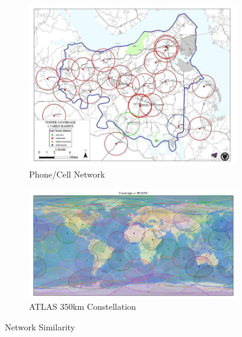 \documentclass{article}
\begin{document}
\begin{figure}[h!]
  \centering
  \begin{subfigure}[b]{0.4\linewidth}
    \includegraphics[width=\linewidth]{figures/cell_coverage}
    \caption{Phone/Cell Network}
  \end{subfigure}
  \begin{subfigure}[b]{0.55\linewidth}
    \includegraphics[width=\linewidth]{figures/350km_coverage}
    \caption{ATLAS 350km Constellation}
  \end{subfigure}
  \caption{Network Similarity}
  \label{fig:networ_sim}
\end{figure}
\end{document}
